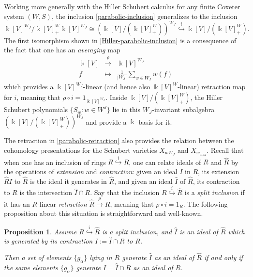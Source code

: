 \documentclass[12pt,dvips]{amsart}
\theoremstyle{plain}
\newtheorem{proposition}[theorem]{Proposition}
\theoremstyle{definition}
\theoremstyle{remark}
\numberwithin{equation}{section}
\begin{document}
  Working more generally with the Hiller Schubert calculus for any finite Coxeter
system $(W,S)$, the inclusion \eqref{parabolic-inclusion} generalizes to the inclusion
\begin{equation}
\label{Hiller-parabolic-inclusion}
\Bbbk[V]^{W_J}/ \Bbbk[V]^W_+ \Bbbk[V]^{W_J} \cong 
  \left( \Bbbk[V] / ( \Bbbk[V]^W_+ ) \right)^{W_J}
    \overset{i}{\hookrightarrow} \Bbbk[V]/(\Bbbk[V]^W_+).
\end{equation}
The first isomorphism shown in \eqref{Hiller-parabolic-inclusion} 
is a consequence of the fact that one has an {\it averaging} map 
\begin{equation}
\label{parabolic-retraction}
\begin{array}{rll}
\Bbbk[V] &\overset{\rho}{\longrightarrow} &\Bbbk[V]^{W_J} \\
f &\longmapsto &\frac{1}{|W_J|} \sum_{w \in W_J} w(f)
\end{array}
\end{equation}
which provides a $\Bbbk[V]^{W_J}$-linear (and hence also
$\Bbbk[V]^W$-linear) retraction map for $i$, meaning that $\rho \circ
i = 1_{\Bbbk[V]^{W_J}}$.  Inside $\Bbbk[V]/(\Bbbk[V]^W_+)$, the Hiller
Schubert polynomials $\{ S_w : w \in W^J\}$ lie in this
$W_J$-invariant subalgebra $\left( \Bbbk[V] / ( \Bbbk[V]^W_+ )
\right)^{W_J}$ and provide a $\Bbbk$-basis for it.

  The retraction in \eqref{parabolic-retraction} 
also provides the relation between the cohomology presentations
for the Schubert varieties $X_{wW_J}$ and $X_{w_{\max}}$.  Recall that when
one has an inclusion of rings $R \overset{i}{\hookrightarrow} \hat{R}$, one can
relate ideals of $R$ and $\hat{R}$ by the operations of {\it extension} and {\it contraction}:
given an ideal $I$ in $R$, its extension $\hat{R}I$ to $\hat{R}$ is the ideal it generates
in $\hat{R}$, and given an ideal $\hat{I}$ of $\hat{R}$, its contraction to $R$ is the intersection $\hat{I} \cap R$.
Say that the inclusion 
$R \overset{i}{\hookrightarrow} \hat{R}$ is a {\it split inclusion} if it has
an $R$-linear {\it retraction}  $\hat{R} \overset{\rho}{\rightarrow} R$, 
meaning that $\rho \circ i = 1_R$.  The following
proposition about this situation is straightforward and well-known.

\begin{proposition}
\label{retraction-proposition}
Assume $R \overset{i}{\hookrightarrow} \hat{R}$ is a split inclusion,
and $\hat{I}$ is an ideal of $\hat{R}$ which is generated by its contraction $I:=\hat{I} \cap R$ to $R$.

Then a set of elements $\{g_\alpha\}$ lying in $R$ generate $\hat{I}$ as an ideal of $\hat{R}$
if and only if the same elements $\{g_\alpha\}$ generate $I=\hat{I}\cap R$ as an ideal of $R$.
\end{proposition}
\end{document}
